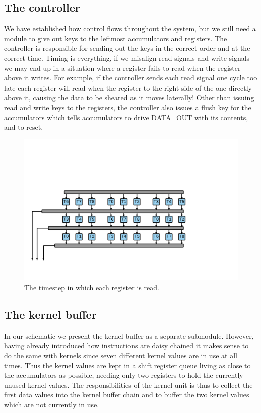 \subsection{The controller}
We have established how control flows throughout the system, but we still need a module to give out keys to the leftmost accumulators and registers.
The controller is responsible for sending out the keys in the correct order and at the correct time.
Timing is everything, if we misalign read signals and write signals we may end up in a situation where a register fails to read when the register above it writes.
For example, if the controller sends each read signal one cycle too late each register will read when the register to the right side of the one directly above it, causing the data to be sheared as it moves laterally!
Other than issuing read and write keys to the registers, the controller also issues a flush key for the accumulators which tells accumulators to drive DATA\_OUT with its contents, and to reset.
\begin{figure}[h!]
    \includegraphics[width=\linewidth]{img/FeederTimeAnnotated.png}
    \caption{The timestep in which each register is read.}
    \label{fig:FeedTime}
\end{figure}

\subsection{The kernel buffer}
In our schematic we present the kernel buffer as a separate submodule. 
However, having already introduced how instructions are daisy chained it makes sense to do the same with kernels since seven different kernel values are in use at all times.
Thus the kernel values are kept in a shift register queue living as close to the accumulators as possible, needing only two registers to hold the currently unused kernel values.
The responsibilities of the kernel unit is thus to collect the first data values into the kernel buffer chain and to buffer the two kernel values which are not currently in use.
